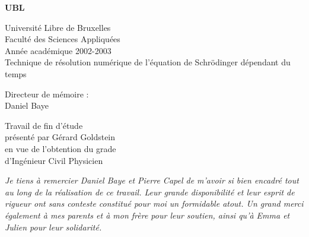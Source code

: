 \documentclass[a4paper, 12pt]{report}
\begin{document}
\begin{center}
  \Huge {\bf UBL} \\
    \vspace{0.5 cm}

  \large Université Libre de Bruxelles\\
  \large Faculté des Sciences Appliquées \\
  \vspace{0.5 cm}
  Année académique 2002-2003\\
    \vspace{7.5 cm}
  \Large Technique de résolution numérique de l'équation de Schrödinger dépendant du temps\\
  \end{center}
  
  \vspace{10 cm}

  \begin{minipage}{0,5 \textwidth}
    \begin{flushleft}
    Directeur de mémoire : \\
    Daniel Baye
  \end{flushleft}
  \end{minipage} \hfill \begin{minipage}{0.5 \textwidth}
    \begin{flushright}
      Travail de fin d'étude \\
      présenté par Gérard Goldstein\\
      en vue de l'obtention du grade\\
      d'Ingénieur Civil Physicien
    \end{flushright}
  \end{minipage}

  \newpage
  
  \vspace*{\fill}
  \begin{flushright}
    \it Je tiens à remercier Daniel Baye et Pierre Capel de m'avoir si bien encadré tout au long de la réalisation de ce travail. Leur grande disponibilité et leur esprit de rigueur ont sans conteste constitué pour moi un formidable atout. Un grand merci également à mes parents et à mon frère pour leur soutien, ainsi qu'à Emma et Julien pour leur solidarité.
  \end{flushright}
  \vspace*{\fill}

  \newpage

  \tableofcontents
\end{document}
